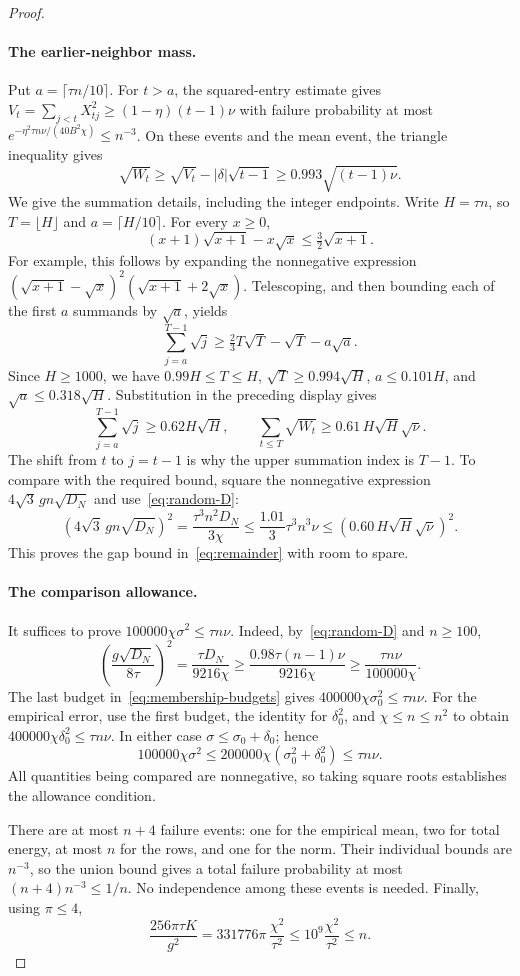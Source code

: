 \documentclass[11pt,a4paper]{article}
\theoremstyle{definition}
\theoremstyle{remark}
\begin{document}
\begin{proof}
\paragraph{The earlier-neighbor mass.}
Put $a=\lceil\tau n/10\rceil$. For $t>a$, the squared-entry estimate gives
$V_t=\sum_{j<t}X_{tj}^2\ge(1-\eta)(t-1)\nu$ with failure probability at most
$e^{-\eta^2\tau n\nu/(40B^2\chi)}\le n^{-3}$.
On these events and the mean event, the triangle inequality gives
\[
 \sqrt{W_t}\ge\sqrt{V_t}-|\delta|\sqrt{t-1}
 \ge0.993\sqrt{(t-1)\nu}.
\]
We give the summation details, including the integer endpoints. Write
$H=\tau n$, so $T=\lfloor H\rfloor$ and $a=\lceil H/10\rceil$.
For every $x\ge0$,
\[
 (x+1)\sqrt{x+1}-x\sqrt x\le\tfrac32\sqrt{x+1}.
\]
For example, this follows by expanding the nonnegative expression
$(\sqrt{x+1}-\sqrt x)^2(\sqrt{x+1}+2\sqrt x)$.
Telescoping, and then bounding each of the first $a$ summands by
$\sqrt a$, yields
\[
 \sum_{j=a}^{T-1}\sqrt j
 \ge \tfrac23 T\sqrt T-\sqrt T-a\sqrt a.
\]
Since $H\ge1000$, we have $0.99H\le T\le H$,
$\sqrt T\ge0.994\sqrt H$, $a\le0.101H$, and
$\sqrt a\le0.318\sqrt H$. Substitution in the preceding display gives
\[
 \sum_{j=a}^{T-1}\sqrt j\ge0.62H\sqrt H,
 \qquad
 \sum_{t\le T}\sqrt{W_t}\ge0.61\,H\sqrt H\sqrt\nu.
\]
The shift from $t$ to $j=t-1$ is why the upper summation index is $T-1$.
To compare with the required bound, square the nonnegative expression
$4\sqrt3\,gn\sqrt{D_N}$ and use~\eqref{eq:random-D}:
\[
 (4\sqrt3\,gn\sqrt{D_N})^2
 =\frac{\tau^3n^2D_N}{3\chi}
 \le\frac{1.01}{3}\tau^3n^3\nu
 \le(0.60\,H\sqrt H\sqrt\nu)^2.
\]
This proves the gap bound in~\eqref{eq:remainder} with room to spare.

\paragraph{The comparison allowance.}
It suffices to prove $100000\chi\sigma^2\le\tau n\nu$.
Indeed, by~\eqref{eq:random-D} and $n\ge100$,
\[
 \left(\frac{g\sqrt{D_N}}{8\tau}\right)^2
 =\frac{\tau D_N}{9216\chi}
 \ge\frac{0.98\tau(n-1)\nu}{9216\chi}
 \ge\frac{\tau n\nu}{100000\chi}.
\]
The last budget in~\eqref{eq:membership-budgets} gives
$400000\chi\sigma_0^2\le\tau n\nu$.
For the empirical error, use the first budget, the identity for
$\delta_0^2$, and $\chi\le n\le n^2$ to obtain
$400000\chi\delta_0^2\le\tau n\nu$.
In either case $\sigma\le\sigma_0+\delta_0$; hence
\[
 100000\chi\sigma^2
 \le200000\chi(\sigma_0^2+\delta_0^2)
 \le\tau n\nu.
\]
All quantities being compared are nonnegative, so taking square roots
establishes the allowance condition.

There are at most $n+4$ failure events: one for the empirical mean,
two for total energy, at most $n$ for the rows, and one for the norm.
Their individual bounds are $n^{-3}$, so the union bound gives a total
failure probability at most $(n+4)n^{-3}\le1/n$. No independence among
these events is needed. Finally, using $\pi\le4$,
\[
 \frac{256\pi\tau K}{g^2}
 =331776\pi\,\frac{\chi^2}{\tau^2}
 \le10^9\frac{\chi^2}{\tau^2}\le n.
\]

\end{proof}
\end{document}
